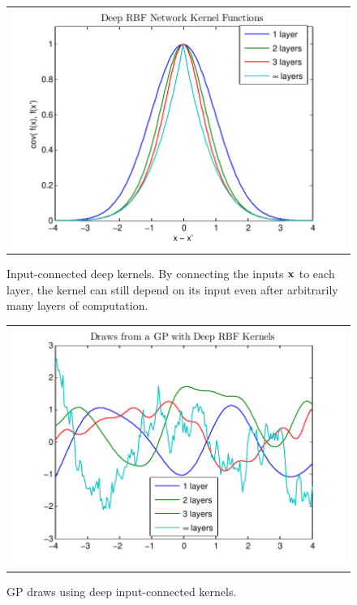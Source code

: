 \documentclass[twoside]{article}
\begin{document}
\begin{figure}
\centering
\begin{tabular}{c}
\hspace{-0.3cm}\includegraphics[width=\columnwidth, clip, trim = 0.17cm 0.1cm 0.9cm 0.3cm]{figures/deep_kernel_connected}
\end{tabular}
\caption{
Input-connected deep kernels.  By connecting the inputs ${\bf{x}}$ to each layer, the kernel can still depend on its input even after arbitrarily many layers of computation.}
\label{fig:deep_kernel_connected}
\end{figure}


\begin{figure}
\centering
\begin{tabular}{c}
\hspace{-0.5cm}\includegraphics[width=\columnwidth, clip, trim = 0cm 0.1cm 0.9cm 0.3cm]{figures/deep_kernel_connected_draws} \\
\end{tabular}
\caption{GP draws using deep input-connected kernels.  
}
\label{fig:deep_kernel_connected_draws}
\end{figure}
\end{document}
